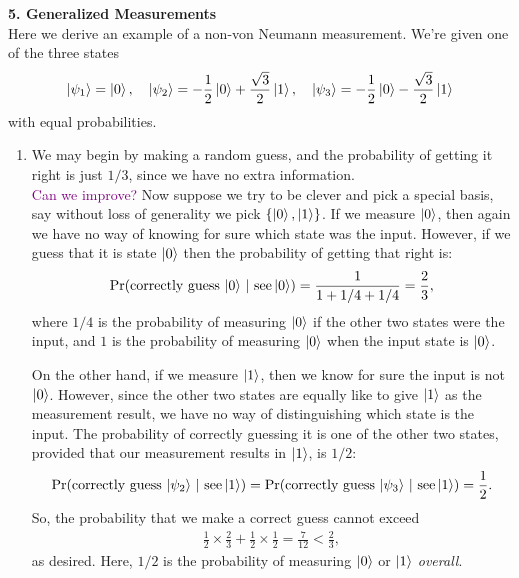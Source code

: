 \documentclass{article}
\theoremstyle{definition}
\newcommand{\f}[2]{\frac{#1}{#2}}
\begin{document}
\noindent \textbf{5. Generalized Measurements}\\


\noindent Here we derive an example of a non-von Neumann measurement. We're given one of the three states
\begin{align*}
	\ket{\psi_1} = \ket{0} , \quad \ket{\psi_2} = -\f{1}{2} \ket{0} + \f{\sqrt{3}}{2}\ket{1}, \quad \ket{\psi_3} = -\f{1}{2}\ket{0} - \f{\sqrt{3}}{2}\ket{1}
\end{align*}
with equal probabilities. 

\begin{enumerate}[label=(\alph*)]
	
	\item We may begin by  making a random guess, and the probability of getting it right is just $1/3$, since we have no extra information. \\
	
	\textcolor{purple}{Can we improve?} Now suppose we try to be clever and pick a special basis, say without loss of generality we pick $\{\ket{0}, \ket{1}\}$. If we measure $\ket{0}$, then again we have no way of knowing for sure which state was the input. However, if we guess that it is state $\ket{0}$ then the probability of getting that right is:
	\begin{align*}
		\Pr(\text{correctly guess $\ket{0}$}\,\, | \,\, \text{see} \ket{0}) =  \f{1}{1+1/4+1/4} = \f{2}{3},
	\end{align*}
	where $1/4$ is the probability of measuring $\ket{0}$ if the other two states were the input, and $1$ is the probability of measuring $\ket{0}$ when the input state is $\ket{0}$. 
	
	On the other hand, if we measure $\ket{1}$, then we know for sure the input is not $\ket{0}$. However, since the other two states are equally like to give $\ket{1}$ as the measurement result, we have no way of distinguishing which state is the input. The probability of correctly guessing it is one of the other two states, provided that our measurement results in $\ket{1}$, is $1/2$:
	\begin{align*}
		\Pr(\text{correctly guess $\ket{\psi_2}$}\,\, | \,\, \text{see} \ket{1}) = \Pr(\text{correctly guess $\ket{\psi_3}$}\,\, | \,\, \text{see} \ket{1}) = \f{1}{2}.
	\end{align*}
	So, the probability that we make a correct guess cannot exceed
	\begin{align*}
		\f{1}{2}\times \f{2}{3} + \f{1}{2}\times \f{1}{2} = \f{7}{12} < \f{2}{3},
	\end{align*}
	as desired. Here, $1/2$ is the probability of measuring $\ket{0}$ or $\ket{1}$ \textit{overall}. 
	

\end{enumerate}
\end{document}
